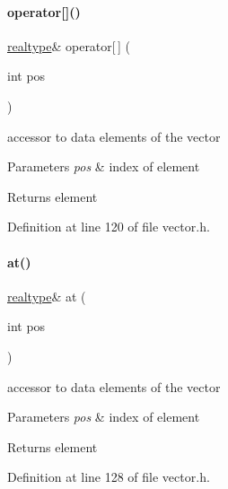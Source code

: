 \paragraph{\texorpdfstring{operator[]()}{operator[]()}}
{\footnotesize\ttfamily \mbox{\hyperlink{namespaceamici_a1bdce28051d6a53868f7ccbf5f2c14a3}{realtype}}\& operator\mbox{[}$\,$\mbox{]} (\begin{DoxyParamCaption}\item[{int}]{pos }\end{DoxyParamCaption})}

accessor to data elements of the vector 
\begin{DoxyParams}{Parameters}
{\em pos} & index of element \\
\hline
\end{DoxyParams}
\begin{DoxyReturn}{Returns}
element 
\end{DoxyReturn}


Definition at line 120 of file vector.\+h.

\mbox{\label{classamici_1_1_ami_vector_ae62cf934983479ccb255785bdf455a2c}} 
\paragraph{\texorpdfstring{at()}{at()}\hspace{0.1cm}{\footnotesize\ttfamily [1/2]}}
{\footnotesize\ttfamily \mbox{\hyperlink{namespaceamici_a1bdce28051d6a53868f7ccbf5f2c14a3}{realtype}}\& at (\begin{DoxyParamCaption}\item[{int}]{pos }\end{DoxyParamCaption})}

accessor to data elements of the vector 
\begin{DoxyParams}{Parameters}
{\em pos} & index of element \\
\hline
\end{DoxyParams}
\begin{DoxyReturn}{Returns}
element 
\end{DoxyReturn}


Definition at line 128 of file vector.\+h.

